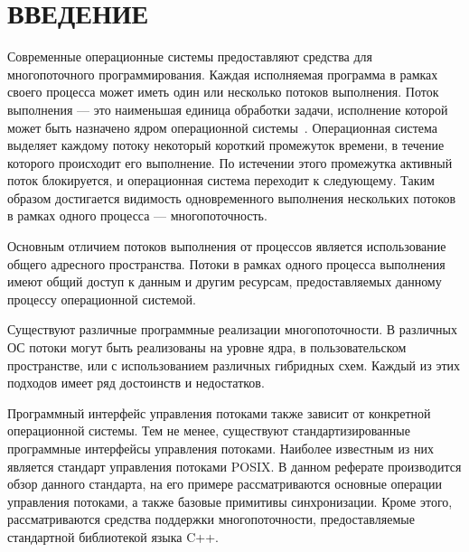 \section*{ВВЕДЕНИЕ}

Современные операционные системы предоставляют средства для
многопоточного программирования.
Каждая исполняемая программа в рамках своего процесса
может иметь один или несколько потоков выполнения.
Поток выполнения --- это наименьшая единица обработки задачи,
исполнение которой может быть назначено ядром операционной
системы~\cite{wiki_thread}.
Операционная система выделяет каждому потоку некоторый короткий
промежуток времени, в течение которого происходит его выполнение.
По истечении этого промежутка активный
поток блокируется, и операционная система переходит к следующему.
Таким образом достигается видимость одновременного выполнения
нескольких потоков в рамках одного процесса --- многопоточность.

Основным отличием потоков выполнения от процессов является
использование общего адресного пространства.
Потоки в рамках одного процесса выполнения имеют общий доступ к данным
и другим ресурсам, предоставляемых данному процессу операционной системой.

Существуют различные программные реализации многопоточности.
В различных ОС потоки могут быть реализованы на уровне ядра,
в пользовательском пространстве, или с использованием различных гибридных схем.
Каждый из этих подходов имеет ряд достоинств и недостатков.

Программный интерфейс управления потоками также зависит от конкретной
операционной системы. Тем не менее, существуют стандартизированные
программные интерфейсы управления потоками.
Наиболее известным из них является стандарт управления потоками POSIX.
В данном реферате производится обзор данного стандарта,
на его примере рассматриваются основные операции
управления потоками, а также базовые примитивы синхронизации.
Кроме этого, рассматриваются средства поддержки многопоточности,
предоставляемые стандартной библиотекой языка C++.
